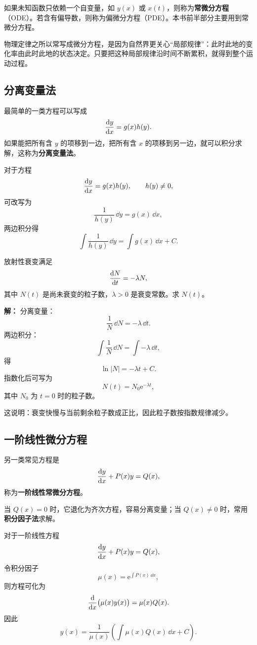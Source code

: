 如果未知函数只依赖一个自变量，如 $y(x)$ 或 $x(t)$，则称为\textbf{常微分方程}（ODE）。若含有偏导数，则称为偏微分方程（PDE）。本书前半部分主要用到常微分方程。

\begin{remark}
物理定律之所以常写成微分方程，是因为自然界更关心“局部规律”：此时此地的变化率由此时此地的状态决定。只要把这种局部规律沿时间不断累积，就得到整个运动过程。
\end{remark}

\subsection{分离变量法}

最简单的一类方程可以写成
\[
  \dv{y}{x} = g(x)h(y).
\]
如果能把所有含 $y$ 的项移到一边，把所有含 $x$ 的项移到另一边，就可以积分求解，这称为\textbf{分离变量法}。

\begin{theorem}[分离变量法]
对于方程
\[
  \dv{y}{x} = g(x)h(y), \qquad h(y)\ne 0,
\]
可改写为
\[
  \frac{1}{h(y)}\,\dd y = g(x)\,\dd x,
\]
两边积分得
\[
  \int \frac{1}{h(y)}\,\dd y = \int g(x)\,\dd x + C.
\]
\end{theorem}

\begin{example}
放射性衰变满足
\[
  \dv{N}{t} = -\lambda N,
\]
其中 $N(t)$ 是尚未衰变的粒子数，$\lambda>0$ 是衰变常数。求 $N(t)$。

\textbf{解：} 分离变量：
\[
  \frac{1}{N}\,\dd N = -\lambda\,\dd t.
\]
两边积分：
\[
  \int \frac{1}{N}\,\dd N = \int -\lambda\,\dd t,
\]
得
\[
  \ln|N| = -\lambda t + C.
\]
指数化后可写为
\[
  N(t)=N_0\mathrm{e}^{-\lambda t},
\]
其中 $N_0$ 为 $t=0$ 时的粒子数。

这说明：衰变快慢与当前剩余粒子数成正比，因此粒子数按指数规律减少。
\end{example}

\subsection{一阶线性微分方程}

另一类常见方程是
\[
  \dv{y}{x} + P(x)y = Q(x),
\]
称为\textbf{一阶线性常微分方程}。

当 $Q(x)=0$ 时，它退化为齐次方程，容易分离变量；当 $Q(x)\ne 0$ 时，常用\textbf{积分因子法}求解。

\begin{theorem}[积分因子法]
对于一阶线性方程
\[
  \dv{y}{x}+P(x)y=Q(x),
\]
令积分因子
\[
  \mu(x)=\mathrm{e}^{\int P(x)\,\dd x},
\]
则方程可化为
\[
  \dv{}{x}\bigl(\mu(x)y(x)\bigr)=\mu(x)Q(x).
\]
因此
\[
  y(x)=\frac{1}{\mu(x)}\left(\int \mu(x)Q(x)\,\dd x + C\right).
\]
\end{theorem}

